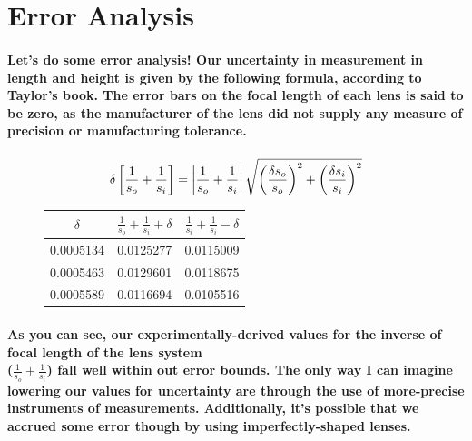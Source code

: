 \documentclass{amsart}
\begin{document}
\section{Error Analysis}
\paragraph{Let's do some error analysis! Our uncertainty in measurement in length and height is given by the following formula, according to Taylor's book. The error bars on the focal length of each lens is said to be zero, as the manufacturer of the lens did not supply any measure of precision or manufacturing tolerance. }
\paragraph{}
\begin{figure}[H]
\begin{minipage}{.55\textwidth}
\begin{equation}
\large\delta \left[\dfrac{1}{s_o} + \dfrac{1}{s_i}\right] = \left|\dfrac{1}{s_o} + \dfrac{1}{s_i} \right| \sqrt{\left( \dfrac{\delta s_o}{s_o} \right)^2+ \left(\dfrac{\delta s_i}{s_i}\right)^2}
\end{equation}
\end{minipage}
%
\begin{minipage}{.4\textwidth}
\begin{table}[H]
\centering
\label{my-label}
\begin{tabular}{c|c|c}
$\delta$ & $\frac{1}{s_o} + \frac{1}{s_i} + \delta $         &   $\frac{1}{s_i} + \frac{1}{s_i} - \delta  $       \\ \hline
0.0005134          & 0.0125277 & 0.0115009 \\
0.0005463          & 0.0129601 & 0.0118675 \\
0.0005589          & 0.0116694 & 0.0105516
\end{tabular}
\end{table}
\end{minipage}
\end{figure}
\paragraph{As you can see, our experimentally-derived values for the inverse of focal length of the lens system \\($\frac{1}{s_o} + \frac{1}{s_i}$) fall well within out error bounds. The only way I can imagine lowering our values for uncertainty are through the use of more-precise instruments of measurements. Additionally, it's possible that we accrued some error though by using imperfectly-shaped lenses. }
\end{document}
